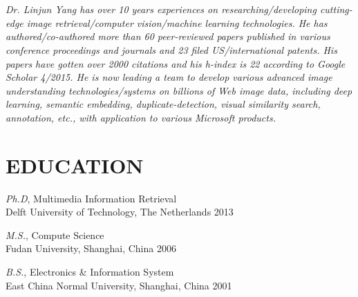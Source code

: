 \documentclass{res}
\begin{document}
\thispagestyle{empty} %

\address{}


\address{Phone:  +1-425-505-9910 \\
Email: linjun.yang@hotmail.com
 }




\begin{resume}

\section{{}}
\emph{Dr. Linjun Yang has over 10 years experiences on researching/developing cutting-edge image retrieval/computer vision/machine learning technologies. He has authored/co-authored more than 60 peer-reviewed papers published in various conference proceedings and journals and 23 filed US/international patents. His papers have gotten over 2000 citations and his h-index is 22 according to Google Scholar 4/2015. He is now leading a team to develop various advanced image understanding technologies/systems on billions of Web image data, including deep learning, semantic embedding, duplicate-detection, visual similarity search, annotation, etc., with application to various Microsoft products.}

\section{{EDUCATION}}
{\sl Ph.D}, Multimedia Information Retrieval \\
Delft University of Technology, The Netherlands \hfill 2013

{\sl M.S.}, Compute Science \\
Fudan University, Shanghai, China \hfill 2006


{\sl B.S.}, Electronics \& Information System \\ %
East China Normal University, Shanghai, China      \hfill   2001


\end{resume}
\end{document}
